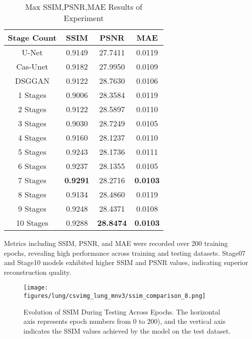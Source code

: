 \documentclass[a4paper, times, 10pt,twocolumn]{article}
\begin{document}
\begin{table}[h]
	\centering
	\caption{Max SSIM,PSNR,MAE Results of Experiment}
	\label{tab:exps_result}
	\begin{tabular}{cccc}
		\hline
		Stage Count & SSIM            & PSNR             & MAE             \\
		\hline
		U-Net       & 0.9149          & 27.7411          & 0.0119          \\
		Cas-Unet    & 0.9182          & 27.9950          & 0.0109          \\
		DSGGAN      & 0.9122          & 28.7630          & 0.0106          \\
		1 Stages    & 0.9006          & 28.3584          & 0.0119          \\
		2 Stages    & 0.9122          & 28.5897          & 0.0110          \\
		3 Stages    & 0.9030          & 28.7249          & 0.0105          \\
		4 Stages    & 0.9160          & 28.1237          & 0.0110          \\
		5 Stages    & 0.9243          & 28.1736          & 0.0111          \\
		6 Stages    & 0.9237          & 28.1355          & 0.0105          \\
		7 Stages    & \textbf{0.9291} & 28.2716          & \textbf{0.0103} \\
		8 Stages    & 0.9134          & 28.4860          & 0.0119          \\
		9 Stages    & 0.9248          & 28.4371          & 0.0108          \\
		10 Stages   & 0.9288          & \textbf{28.8474} & \textbf{0.0103} \\
		\hline
	\end{tabular}
\end{table}

Metrics including SSIM, PSNR, and MAE were recorded over 200 training epochs, revealing high performance across training and testing datasets. Stage07 and Stage10 models exhibited higher SSIM and PSNR values, indicating superior reconstruction quality.

\begin{figure*}[h]
	\centering
	\texttt{[image: figures/lung/csvimg\_lung\_mnv3/ssim\_comparison\_8.png]}
	\caption[ssim]{Evolution of SSIM During Testing Across Epochs. The horizontal axis represents epoch numbers from 0 to 200), and the vertical axis indicates the SSIM values achieved by the model on the test dataset.}
	\label{fig:ssim}
\end{figure*}
\end{document}
